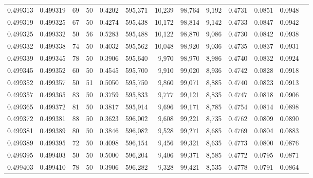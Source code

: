 \begin{tabular}{rrrrrrrrrrrrr}
0.499313 & 0.499319 &    69 &  50 &                                     0.4202 & 595,371 &  10,239 &  98,764 &   9,192 & 0.4731 & 0.0851 & 0.0948 \\
0.499319 & 0.499325 &    67 &  50 &                                     0.4274 & 595,438 &  10,172 &  98,814 &   9,142 & 0.4733 & 0.0847 & 0.0942 \\
0.499325 & 0.499332 &    50 &  56 &                                     0.5283 & 595,488 &  10,122 &  98,870 &   9,086 & 0.4730 & 0.0842 & 0.0938 \\
0.499332 & 0.499338 &    74 &  50 &                                     0.4032 & 595,562 &  10,048 &  98,920 &   9,036 & 0.4735 & 0.0837 & 0.0931 \\
0.499339 & 0.499345 &    78 &  50 &                                     0.3906 & 595,640 &   9,970 &  98,970 &   8,986 & 0.4740 & 0.0832 & 0.0924 \\
0.499345 & 0.499352 &    60 &  50 &                                     0.4545 & 595,700 &   9,910 &  99,020 &   8,936 & 0.4742 & 0.0828 & 0.0918 \\
0.499352 & 0.499357 &    50 &  51 &                                     0.5050 & 595,750 &   9,860 &  99,071 &   8,885 & 0.4740 & 0.0823 & 0.0913 \\
0.499357 & 0.499365 &    83 &  50 &                                     0.3759 & 595,833 &   9,777 &  99,121 &   8,835 & 0.4747 & 0.0818 & 0.0906 \\
0.499365 & 0.499372 &    81 &  50 &                                     0.3817 & 595,914 &   9,696 &  99,171 &   8,785 & 0.4754 & 0.0814 & 0.0898 \\
0.499372 & 0.499381 &    88 &  50 &                                     0.3623 & 596,002 &   9,608 &  99,221 &   8,735 & 0.4762 & 0.0809 & 0.0890 \\
0.499381 & 0.499389 &    80 &  50 &                                     0.3846 & 596,082 &   9,528 &  99,271 &   8,685 & 0.4769 & 0.0804 & 0.0883 \\
0.499389 & 0.499395 &    72 &  50 &                                     0.4098 & 596,154 &   9,456 &  99,321 &   8,635 & 0.4773 & 0.0800 & 0.0876 \\
0.499395 & 0.499403 &    50 &  50 &                                     0.5000 & 596,204 &   9,406 &  99,371 &   8,585 & 0.4772 & 0.0795 & 0.0871 \\
0.499403 & 0.499410 &    78 &  50 &                                     0.3906 & 596,282 &   9,328 &  99,421 &   8,535 & 0.4778 & 0.0791 & 0.0864 \\

\end{tabular}
